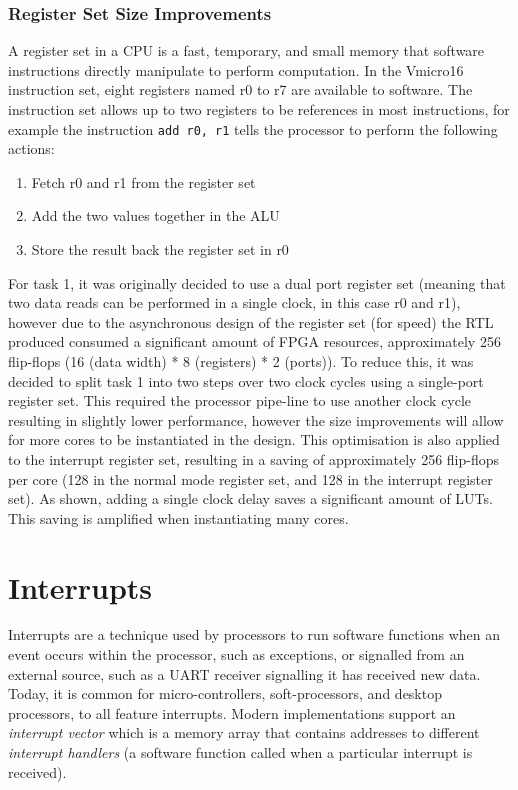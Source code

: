 \subsubsection{Register Set Size Improvements}
A register set in a CPU is a fast, temporary, and small memory that software instructions directly manipulate to perform computation. In the Vmicro16 instruction set, eight registers named r0 to r7 are available to software. The instruction set allows up to two registers to be references in most instructions, for example the instruction \verb|add r0, r1| tells the processor to perform the following actions:
\begin{enumerate}[leftmargin=4\parindent, label=\bfseries Clock \arabic*.]
\item Fetch r0 and r1 from the register set
\item Add the two values together in the ALU
\item Store the result back the register set in r0
\end{enumerate}
For task 1, it was originally decided to use a dual port register set (meaning that two data reads can be performed in a single clock, in this case r0 and r1), however due to the asynchronous design of the register set (for speed) the RTL produced consumed a significant amount of FPGA resources, approximately 256 flip-flops (16 (data width) * 8 (registers) * 2 (ports)). To reduce this, it was decided to split task 1 into two steps over two clock cycles using a single-port register set. This required the processor pipe-line to use another clock cycle resulting in slightly lower performance, however the size improvements will allow for more cores to be instantiated in the design. This optimisation is also applied to the interrupt register set, resulting in a saving of approximately 256 flip-flops per core (128 in the normal mode register set, and 128 in the interrupt register set). As shown, adding a single clock delay saves a significant amount of LUTs. This saving is amplified when instantiating many cores.



\section{Interrupts}
\label{sect:interrupts}
Interrupts are a technique used by processors to run software functions when an event occurs within the processor, such as exceptions, or signalled from an external source, such as a UART receiver signalling it has received new data. Today, it is common for micro-controllers, soft-processors, and desktop processors, to all feature interrupts. Modern implementations support an \textit{interrupt vector} which is a memory array that contains addresses to different \textit{interrupt handlers} (a software function called when a particular interrupt is received).

